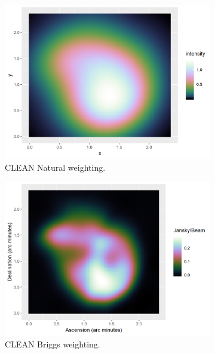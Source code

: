 \begin{figure}[h]
	\centering
	\begin{subfigure}[b]{0.32\linewidth}
		\includegraphics[width=1.00\linewidth]{./chapters/10.results/MSClean/Natural-N132.png}
		\caption{CLEAN Natural weighting.}
		\label{results:N132:clean}
	\end{subfigure}
	\begin{subfigure}[b]{0.32\linewidth}
		\includegraphics[width=1.00\linewidth]{./chapters/10.results/MSClean/Briggs-N132.png}
		\caption{CLEAN Briggs weighting.}
		\label{results:N132:cleanbriggs}
	\end{subfigure}
	\begin{subfigure}[b]{0.32\linewidth}

\end{subfigure}
\end{figure}
